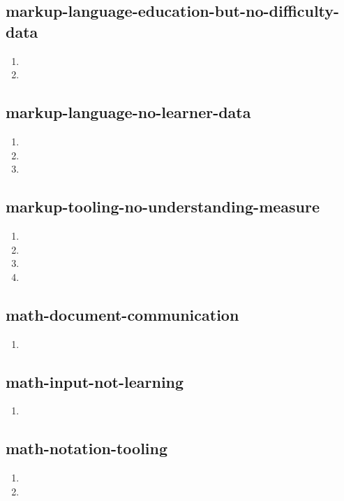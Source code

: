 \documentclass{article}
\begin{document}
\subsection{markup-language-education-but-no-difficulty-data}
\begin{enumerate}
\item {}
\item {}
\end{enumerate}

\subsection{markup-language-no-learner-data}
\begin{enumerate}
\item {}
\item {}
\item {}
\end{enumerate}

\subsection{markup-tooling-no-understanding-measure}
\begin{enumerate}
\item {}
\item {}
\item {}
\item {}
\end{enumerate}

\subsection{math-document-communication}
\begin{enumerate}
\item {}
\end{enumerate}

\subsection{math-input-not-learning}
\begin{enumerate}
\item {}
\end{enumerate}

\subsection{math-notation-tooling}
\begin{enumerate}
\item {}
\item {}
\end{enumerate}
\end{document}
